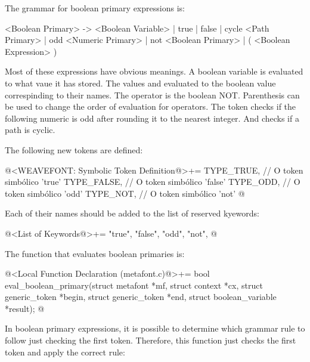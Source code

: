 {{{{{

The grammar for boolean primary expressions is:

\alinhaverbatim
<Boolean Primary> -> <Boolean Variable> | true | false |
                     cycle <Path Primary> | odd <Numeric Primary> |
                     not <Boolean Primary> |
                     ( <Boolean Expression> )
\alinhanormal

Most of these expressions have obvious meanings. A boolean variable is
evaluated to what vaue it has stored. The values 
and  evaluated to the boolean value correspinding to
their names. The  operator is the boolean
NOT. Parenthesis can be used to change the order of evaluation for
operators. The token  checks if the following numeric
is odd after rounding it to the nearest
integer. And  checks if a path is cyclic.

The following new tokens are defined:

\iniciocodigo
@<WEAVEFONT: Symbolic Token Definition@>+=
TYPE_TRUE,                    // O token simbólico 'true'
TYPE_FALSE,                   // O token simbólico 'false'
TYPE_ODD,                     // O token simbólico 'odd'
TYPE_NOT,                     // O token simbólico 'not'
@
\fimcodigo

Each of their names should be added to the list of reserved kyewords:

\iniciocodigo
@<List of Keywords@>+=
"true", "false", "odd", "not",
@
\fimcodigo

The function that evaluates boolean primaries is:

\iniciocodigo
@<Local Function Declaration (metafont.c)@>+=
bool eval_boolean_primary(struct metafont *mf, struct context *cx,
                          struct generic_token *begin,
                          struct generic_token *end,
                          struct boolean_variable *result);
@
\fimcodigo

In boolean primary expressions, it is possible to determine which
grammar rule to follow just checking the first token. Therefore, this
function just checks the first token and apply the correct rule:

}}}}}
